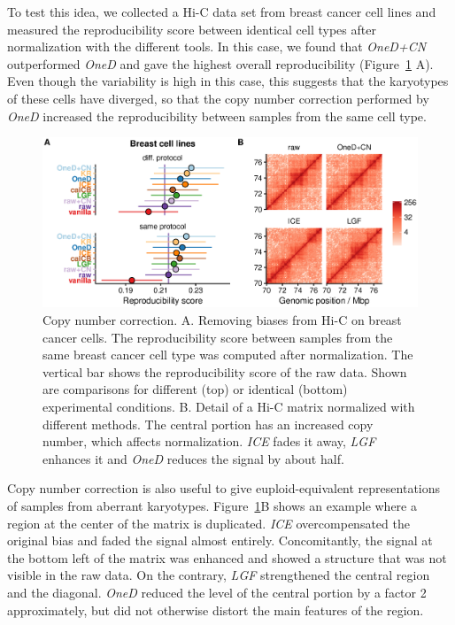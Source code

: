\documentclass[a4,center,fleqn]{NAR}
\providecommand{\DIFadd}[1]{{\protect\color{red}#1}} %
\providecommand{\DIFdel}[1]{{\protect}}                      %
\providecommand{\DIFaddbegin}{} %
\providecommand{\DIFaddend}{} %
\providecommand{\DIFdelbegin}{} %
\providecommand{\DIFdelend}{} %
\providecommand{\DIFaddFL}[1]{\DIFadd{#1}} %
\begin{document}
\DIFadd{To test this idea, we collected a Hi-C data set from breast cancer cell
lines and measured the reproducibility score between identical cell types
after normalization with the different tools. In this case, we found that
}\textit{\DIFadd{OneD+CN}} \DIFadd{outperformed }\textit{\DIFadd{OneD}} \DIFadd{and gave the highest overall
reproducibility }\DIFaddend (Figure~\ref{fig:cnv_correction}\DIFdelbegin \DIFdel{). In
this example, }\textit{\DIFdel{ICE}} %
\DIFdel{overcompensated the original bias }\DIFdelend \DIFaddbegin \DIFadd{A). Even though the
variability is high in this case, this suggests that the karyotypes of
these cells have diverged, so that the copy number correction performed by
}\textit{\DIFadd{OneD}} \DIFadd{increased the reproducibility between samples from the same
cell type.
}

\begin{figure}
\centerline{\includegraphics[width=.49\textwidth]{figure_4.eps}}
\caption{\DIFaddFL{Copy number correction. A. Removing biases from Hi-C on breast
cancer cells. The reproducibility score between samples from the same
breast cancer cell type was computed after normalization. The vertical bar
shows the reproducibility score of the raw data. Shown are comparisons for
different (top) or identical (bottom) experimental conditions. B. Detail
of a Hi-C matrix normalized with different methods. The central portion
has an increased copy number, which affects normalization. }\textit{\DIFaddFL{ICE}}
\DIFaddFL{fades it away, }\textit{\DIFaddFL{LGF}} \DIFaddFL{enhances it and }\textit{\DIFaddFL{OneD}} \DIFaddFL{reduces the
signal by about half.}}
\label{fig:cnv_correction}
\end{figure}

\DIFadd{Copy number correction is also useful to give euploid-equivalent
representations of samples from aberrant karyotypes.
Figure~\ref{fig:cnv_correction}B shows an example where a region }\DIFaddend at the
center of the \DIFdelbegin \DIFdel{picture }\DIFdelend \DIFaddbegin \DIFadd{matrix is duplicated. }\textit{\DIFadd{ICE}} \DIFadd{overcompensated the
original bias }\DIFaddend and faded the signal almost entirely. Concomitantly, the
signal at the bottom left of the matrix was enhanced and showed a
structure that was not visible in the raw data. On the contrary,
\textit{LGF} strengthened the central region and the diagonal.
\textit{OneD} reduced the level of the central portion by a factor 2
approximately, but did not otherwise distort the main features of the
region.
\DIFdelbegin \DIFdel{This example shows that the copy number does not have a simple and predictable effect on the final matrix. Not taking it into account may
open the door to some normalization artifacts. }\DIFdelend 
\end{document}
